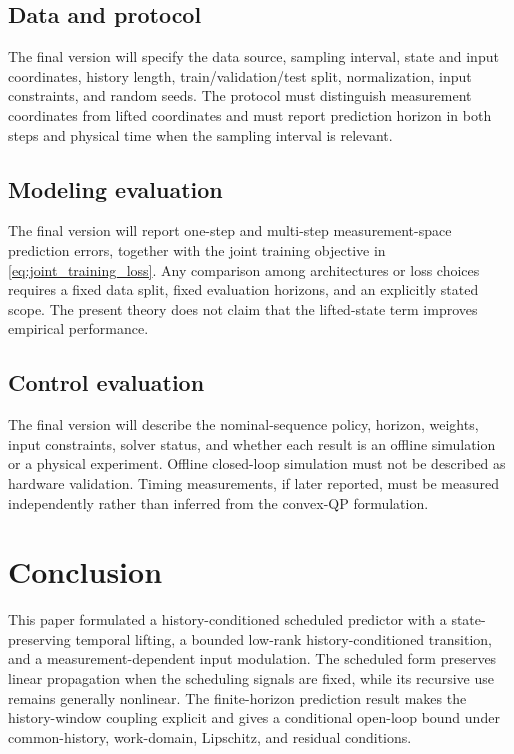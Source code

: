 ﻿\documentclass[journal]{IEEEtran}
\begin{document}
\subsection{Data and protocol}

The final version will specify the data source, sampling interval, state and input coordinates, history length, train/validation/test split, normalization, input constraints, and random seeds. The protocol must distinguish measurement coordinates from lifted coordinates and must report prediction horizon in both steps and physical time when the sampling interval is relevant.

\subsection{Modeling evaluation}

The final version will report one-step and multi-step measurement-space prediction errors, together with the joint training objective in \eqref{eq:joint_training_loss}. Any comparison among architectures or loss choices requires a fixed data split, fixed evaluation horizons, and an explicitly stated scope. The present theory does not claim that the lifted-state term improves empirical performance.

\subsection{Control evaluation}

The final version will describe the nominal-sequence policy, horizon, weights, input constraints, solver status, and whether each result is an offline simulation or a physical experiment. Offline closed-loop simulation must not be described as hardware validation. Timing measurements, if later reported, must be measured independently rather than inferred from the convex-QP formulation.

\section{Conclusion}
\label{sec:conclusion}

This paper formulated a history-conditioned scheduled predictor with a state-preserving temporal lifting, a bounded low-rank history-conditioned transition, and a measurement-dependent input modulation. The scheduled form preserves linear propagation when the scheduling signals are fixed, while its recursive use remains generally nonlinear. The finite-horizon prediction result makes the history-window coupling explicit and gives a conditional open-loop bound under common-history, work-domain, Lipschitz, and residual conditions.
\end{document}
